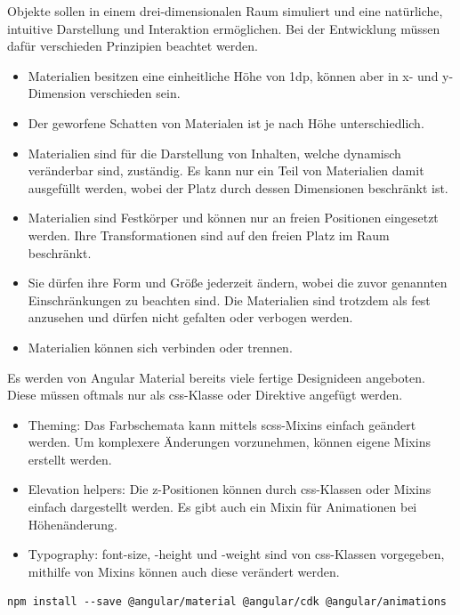 Objekte sollen in einem drei-dimensionalen Raum simuliert und eine natürliche, intuitive Darstellung und Interaktion ermöglichen. Bei der Entwicklung müssen dafür verschieden Prinzipien beachtet werden. 
\begin{itemize}
  \item Materialien besitzen eine einheitliche Höhe von 1dp, können aber in x- und y-Dimension verschieden sein.
  \item Der geworfene Schatten von Materialen ist je nach Höhe unterschiedlich.
  \item Materialien sind für die Darstellung von Inhalten, welche dynamisch veränderbar sind, zuständig. Es kann nur ein Teil von Materialien damit ausgefüllt werden, wobei der Platz durch dessen Dimensionen beschränkt ist.
  \item Materialien sind Festkörper und können nur an freien Positionen eingesetzt werden. Ihre Transformationen sind auf den freien Platz im Raum beschränkt.
  \item Sie dürfen ihre Form und Größe jederzeit ändern, wobei die zuvor genannten Einschränkungen zu beachten sind. Die Materialien sind trotzdem als fest anzusehen und dürfen nicht gefalten oder verbogen werden.
  \item Materialien können sich verbinden oder trennen.
\end{itemize}

Es werden von Angular Material bereits viele fertige Designideen angeboten. Diese müssen oftmals nur als css-Klasse oder Direktive angefügt werden.

\begin{itemize}
  \item Theming: Das Farbschemata kann mittels scss-Mixins einfach geändert werden. Um komplexere Änderungen vorzunehmen, können eigene Mixins erstellt werden.
  \item Elevation helpers: Die z-Positionen können durch css-Klassen oder Mixins einfach dargestellt werden. Es gibt auch ein Mixin für Animationen bei Höhenänderung.
  \item Typography: font-size, -height und -weight sind von css-Klassen vorgegeben, mithilfe von Mixins können auch diese verändert werden. \\
\end{itemize} 

\begin{lstlisting}[caption=Hinzufügen von Angular Materials]
  npm install --save @angular/material @angular/cdk @angular/animations
\end{lstlisting}

